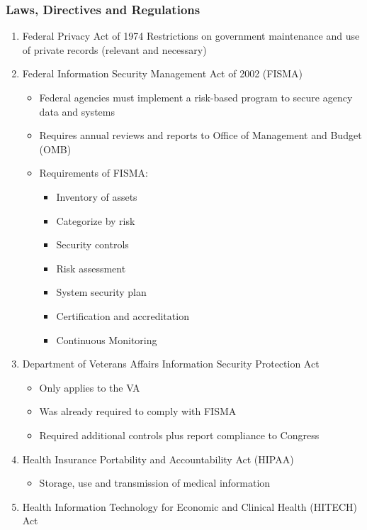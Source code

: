 \documentclass[11pt]{article}
\begin{document}
\subsubsection{Laws, Directives and Regulations}
\label{sec:orgc8fb906}
\begin{enumerate}
\item Federal Privacy Act of 1974
\label{sec:orgf7ed3f1}
Restrictions on government maintenance and use of private records (relevant and necessary)
\item Federal Information Security Management Act of 2002 (FISMA)
\label{sec:orgc442d76}
\begin{itemize}
\item Federal agencies must implement a risk-based program to secure agency data and systems
\item Requires annual reviews and reports to Office of Management and Budget (OMB)
\item Requirements of FISMA:
\begin{itemize}
\item Inventory of assets
\item Categorize by risk
\item Security controls
\item Risk assessment
\item System security plan
\item Certification and accreditation
\item Continuous Monitoring
\end{itemize}
\end{itemize}
\item Department of Veterans Affairs Information Security Protection Act
\label{sec:orgc253680}
\begin{itemize}
\item Only applies to the VA
\item Was already required to comply with FISMA
\item Required additional controls plus report compliance to Congress
\end{itemize}
\item Health Insurance Portability and Accountability Act (HIPAA)
\label{sec:orga30eda0}
\begin{itemize}
\item Storage, use and transmission of medical information
\end{itemize}
\item Health Information Technology for Economic and Clinical Health (HITECH) Act
\label{sec:org982809d}

\end{enumerate}
\end{document}
